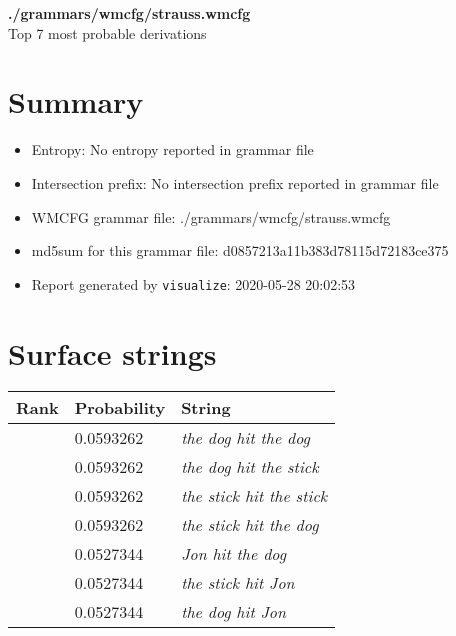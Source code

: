 \documentclass[11pt]{article}
\begin{document}
\begin{center}
{\huge \textbf{./grammars/wmcfg/strauss.wmcfg}} \\[0.5em]
{\normalsize Top 7 most probable derivations}
\end{center}

\section{Summary}
\begin{itemize}
	\item Entropy: No entropy reported in grammar file
	\item Intersection prefix: No intersection prefix reported in grammar file
	\item WMCFG grammar file: ./grammars/wmcfg/strauss.wmcfg
	\item md5sum for this grammar file: d0857213a11b383d78115d72183ce375
	\item Report generated by \texttt{visualize}: 2020-05-28 20:02:53
\end{itemize}

\section{Surface strings}
\hspace{1em}
\renewcommand{\arraystretch}{1.15}
\newcommand\rownumber{\stepcounter{rownumber}\arabic{rownumber}}
\begin{tabular}{l l l}
	\hline
	 Rank & Probability & String \\
	\hline
\rownumber & 0.0593262 & \textit{the dog hit the dog} \\
\rownumber & 0.0593262 & \textit{the dog hit the stick} \\
\rownumber & 0.0593262 & \textit{the stick hit the stick} \\
\rownumber & 0.0593262 & \textit{the stick hit the dog} \\
\rownumber & 0.0527344 & \textit{Jon hit the dog} \\
\rownumber & 0.0527344 & \textit{the stick hit Jon} \\
\rownumber & 0.0527344 & \textit{the dog hit Jon} \\
	\hline
\end{tabular}
\pagebreak
\end{document}
